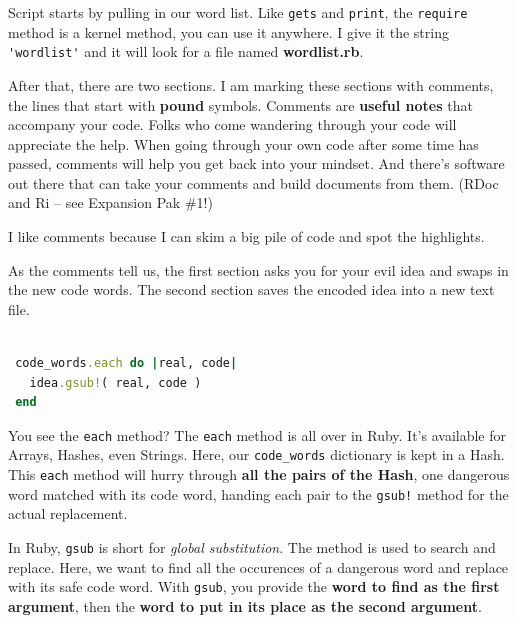 \documentclass[10pt,twoside]{report}
\begin{document}
Script starts by pulling in our word list.  Like
\lstinline[breaklines=true]|gets| and
\lstinline[breaklines=true]|print|, the
\lstinline[breaklines=true]|require| method is a kernel method, you
can use it anywhere.  I give it the string
\lstinline[breaklines=true]|'wordlist'| and it will look for a file
named {\bf wordlist.rb}.

After that, there are two sections.  I am marking these sections with
comments, the lines that start with {\bf pound} symbols.  Comments are
{\bf useful notes} that accompany your code.  Folks who come wandering
through your code will appreciate the help.  When going through your
own code after some time has passed, comments will help you get back
into your mindset.  And there's software out there that can take your
comments and build documents from them.  (RDoc and Ri -- see Expansion
Pak \#1!)

I like comments because I can skim a big pile of code and spot the
highlights.

As the comments tell us, the first section asks you for your evil idea
and swaps in the new code words.  The second section saves the encoded
idea into a new text file.


\begin{lstlisting}[basicstyle=\ttfamily\color{basiccolor},
    commentstyle = \ttfamily\color{commentcolor},
    keywordstyle=\ttfamily\color{keywordscolor},
    stringstyle=\color{stringcolor},
    language=Ruby,
    basicstyle=\small\ttfamily,
    showstringspaces=false,
  ]

 code_words.each do |real, code|
   idea.gsub!( real, code )
 end

\end{lstlisting}

You see the \lstinline[breaklines=true]|each| method?  The
\lstinline[breaklines=true]|each| method is all over in Ruby.  It's
available for Arrays, Hashes, even Strings.  Here, our
\lstinline[breaklines=true]|code_words| dictionary is kept in a Hash.
This \lstinline[breaklines=true]|each| method will hurry through {\bf
  all the pairs of the Hash}, one dangerous word matched with its code
word, handing each pair to the \lstinline[breaklines=true]|gsub!|
method for the actual replacement.

In Ruby, \lstinline[breaklines=true]|gsub| is short for {\em global
  substitution}.  The method is used to search and replace. Here, we
want to find all the occurences of a dangerous word and replace with
its safe code word.  With \lstinline[breaklines=true]|gsub|, you
provide the {\bf word to find as the first argument}, then the {\bf
  word to put in its place as the second argument}.
\end{document}
